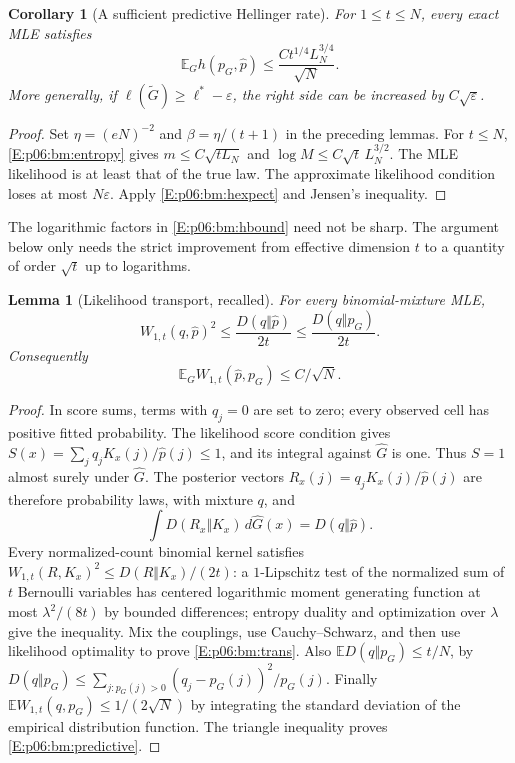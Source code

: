 \documentclass[11pt,a4paper]{article}
\newtheorem{lemma}[theorem]{Lemma}
\newtheorem{corollary}[theorem]{Corollary}
\theoremstyle{definition}
\theoremstyle{remark}
\numberwithin{equation}{section}
\begin{document}
\begin{corollary}[A sufficient predictive Hellinger rate]
\label{E:p06:bm:hellinger}
For $1\le t\le N$, every exact MLE satisfies
\begin{equation}\label{E:p06:bm:hbound}
 \mathbb E_G h(p_G,\widehat p)
       \le \frac{C t^{1/4}L_N^{3/4}}{\sqrt N}.
\end{equation}
More generally, if $\ell(\widetilde G)\ge\ell^*-\varepsilon$, the right
side can be increased by $C\sqrt\varepsilon$.
\end{corollary}
\begin{proof}
Set $\eta=(eN)^{-2}$ and $\beta=\eta/(t+1)$ in the preceding lemmas.
For $t\le N$, \eqref{E:p06:bm:entropy} gives
$m\le C\sqrt{tL_N}$ and
$\log M\le C\sqrt t\,L_N^{3/2}$. The MLE likelihood is at least that of
the true law. The approximate likelihood condition loses at most
$N\varepsilon$. Apply \eqref{E:p06:bm:hexpect} and Jensen's inequality.
\end{proof}

The logarithmic factors in \eqref{E:p06:bm:hbound} need not be sharp. The
argument below only needs the strict improvement from effective dimension
$t$ to a quantity of order $\sqrt t$ up to logarithms.

\begin{lemma}[Likelihood transport, recalled]
\label{E:p06:bm:transport}
For every binomial-mixture MLE,
\begin{equation}\label{E:p06:bm:trans}
 W_{1,t}(q,\widehat p)^2\le\frac{D(q\Vert\widehat p)}{2t}
                    \le\frac{D(q\Vert p_G)}{2t}.
\end{equation}
Consequently
\begin{equation}\label{E:p06:bm:predictive}
 \mathbb E_G W_{1,t}(\widehat p,p_G)\le C/\sqrt N.
\end{equation}
\end{lemma}
\begin{proof}
In score sums, terms with $q_j=0$ are set to zero; every observed
cell has positive fitted probability. The likelihood score condition gives
$S(x)=\sum_jq_jK_x(j)/\widehat p(j)\le1$, and its integral against
$\widehat G$ is one. Thus $S=1$ almost surely under $\widehat G$.
The posterior vectors $R_x(j)=q_jK_x(j)/\widehat p(j)$ are therefore
probability laws, with mixture $q$, and
\[
 \int D(R_x\Vert K_x)\,d\widehat G(x)=D(q\Vert\widehat p).
\]
Every normalized-count binomial kernel satisfies
$W_{1,t}(R,K_x)^2\le D(R\Vert K_x)/(2t)$: a $1$-Lipschitz test of the
normalized sum of $t$ Bernoulli variables has centered logarithmic moment
generating function at most $\lambda^2/(8t)$ by bounded differences;
entropy duality and optimization over $\lambda$ give the inequality.
Mix the couplings, use Cauchy--Schwarz, and then use likelihood optimality
to prove \eqref{E:p06:bm:trans}. Also
$\mathbb E D(q\Vert p_G)\le t/N$, by
$D(q\Vert p_G)\le\sum_{j:p_G(j)>0}(q_j-p_G(j))^2/p_G(j)$.
Finally $\mathbb E W_{1,t}(q,p_G)\le1/(2\sqrt N)$ by integrating the
standard deviation of the empirical distribution function. The triangle
inequality proves \eqref{E:p06:bm:predictive}.
\end{proof}
\end{document}
